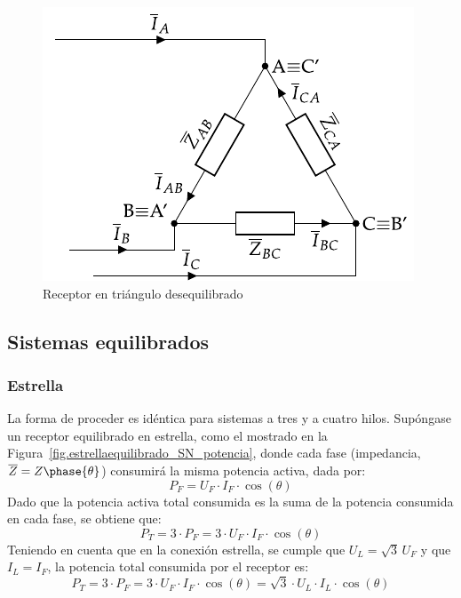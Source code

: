 \documentclass[11pt]{book} %
\begin{document}
	\begin{figure}
	    \centering
	    \includegraphics{../figs/trianguloDesequilibrado_receptor.pdf}
	    \caption{Receptor en triángulo desequilibrado}
	    \label{fig.trianguloDesequilibrado_receptor_potencia}
	\end{figure}
	
	\subsection{Sistemas equilibrados}
	
	\subsubsection{Estrella}
	
	La forma de proceder es idéntica para sistemas a tres y a cuatro hilos. Supóngase un receptor equilibrado en estrella, como el mostrado en la Figura~\ref{fig.estrellaequilibrado_SN_potencia}, donde cada fase (impedancia, $\overline{Z}=Z\phase{\theta}$) consumirá la misma potencia activa, dada por: 
	\begin{equation*}
	    P_F=U_{F}\cdot I_F \cdot \cos(\theta)
	\end{equation*}
	Dado que la potencia activa total consumida es la suma de la potencia consumida en cada fase, se obtiene que:
	\begin{equation*}
	    P_T=3\cdot P_F=3\cdot U_F\cdot I_F\cdot\cos(\theta)
	\end{equation*}
	Teniendo en cuenta que en la conexión estrella, se cumple que $U_L=\sqrt{3}\,U_F$ y que $I_L=I_F$, la potencia total consumida por el receptor es: 
	\begin{equation}
	    \boxed{P_T=3\cdot P_F=3\cdot U_F\cdot {I_F}\cdot\cos(\theta)=\sqrt{3}\cdot U_L\cdot I_L\cdot\cos(\theta)}
	\end{equation}
	
\end{document}
